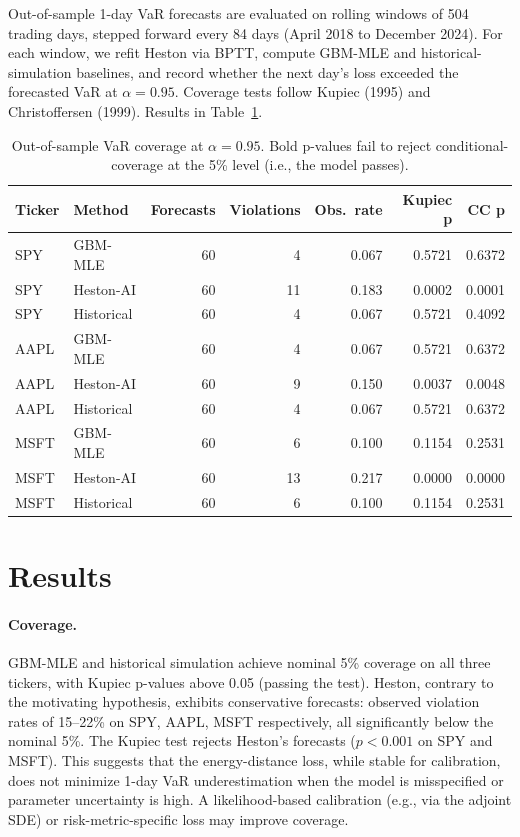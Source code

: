 \documentclass[11pt]{article}
\begin{document}
Out-of-sample 1-day VaR forecasts are evaluated on rolling windows of 504 trading days, stepped forward every 84 days (April 2018 to December 2024). For each window, we refit Heston via BPTT, compute GBM-MLE and historical-simulation baselines, and record whether the next day's loss exceeded the forecasted VaR at $\alpha = 0.95$. Coverage tests follow Kupiec (1995) and Christoffersen (1999). Results in Table~\ref{tab:coverage}.

\begin{table}[h]
\centering
\caption{Out-of-sample VaR coverage at $\alpha = 0.95$. Bold p-values fail to
reject conditional-coverage at the 5\% level (i.e., the model passes).}
\label{tab:coverage}
\begin{tabular}{llrrrrr}
\toprule
Ticker & Method & Forecasts & Violations & Obs.\ rate & Kupiec p & CC p \\
\midrule
SPY    & GBM-MLE     & 60 & 4 & 0.067 & 0.5721 & 0.6372 \\
SPY    & Heston-AI   & 60 & 11 & 0.183 & 0.0002 & 0.0001 \\
SPY    & Historical  & 60 & 4 & 0.067 & 0.5721 & 0.4092 \\
\addlinespace
AAPL   & GBM-MLE     & 60 & 4 & 0.067 & 0.5721 & 0.6372 \\
AAPL   & Heston-AI   & 60 & 9 & 0.150 & 0.0037 & 0.0048 \\
AAPL   & Historical  & 60 & 4 & 0.067 & 0.5721 & 0.6372 \\
\addlinespace
MSFT   & GBM-MLE     & 60 & 6 & 0.100 & 0.1154 & 0.2531 \\
MSFT   & Heston-AI   & 60 & 13 & 0.217 & 0.0000 & 0.0000 \\
MSFT   & Historical  & 60 & 6 & 0.100 & 0.1154 & 0.2531 \\
\bottomrule
\end{tabular}
\end{table}

\section{Results}
\label{sec:results}

\paragraph{Coverage.} GBM-MLE and historical simulation achieve nominal 5\% coverage on all three tickers, with Kupiec p-values above 0.05 (passing the test). Heston, contrary to the motivating hypothesis, exhibits conservative forecasts: observed violation rates of 15--22\% on SPY, AAPL, MSFT respectively, all significantly below the nominal 5\%. The Kupiec test rejects Heston's forecasts ($p < 0.001$ on SPY and MSFT). This suggests that the energy-distance loss, while stable for calibration, does not minimize 1-day VaR underestimation when the model is misspecified or parameter uncertainty is high. A likelihood-based calibration (e.g., via the adjoint SDE) or risk-metric-specific loss may improve coverage.
\end{document}
